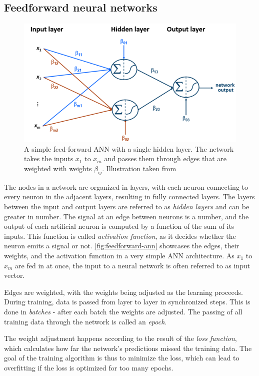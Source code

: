\subsection{Feedforward neural networks}
\label{sec:feedforward-networks}
\begin{figure}[ht!]
    \centering
    \includegraphics[width=.85\textwidth]{gfx/feedforward-neural-network.png}
    \caption[A simple feed-forward ANN with a single hidden layer]{A simple feed-forward ANN with a single hidden layer. The network takes the inputs $x_1$ to $x_m$ and passes them through edges that are weighted with weights $\beta_{ij}$. Illustration taken from \cite{lessmannBADS}}
    \label{fig:feedforward-ann}
\end{figure}

The nodes in a network are organized in layers, with each neuron connecting to every neuron in the adjacent layers, resulting in fully connected layers. The layers between the input and output layers are referred to as \textit{hidden layers} and  can be greater in number. The signal at an edge between neurons is a number, and the output of each artificial neuron is computed by a function of the sum of its inputs. This function is called \textit{activation function}, as it decides whether the neuron emits a signal or not. \autoref{fig:feedforward-ann} showcases the edges, their weights, and the activation function in a very simple ANN architecture. As $x_1$ to $x_m$ are fed in at once, the input to a neural network is often referred to as input vector.

Edges are weighted, with the weights being adjusted as the learning proceeds. During training, data is passed from layer to layer in synchronized steps. This is done in \textit{batches} - after each batch the weights are adjusted. The passing of all training data through the network is called an \textit{epoch}.

The weight adjustment happens according to the result of the \textit{loss function}, which calculates how far the network's predictions missed the training data. The goal of the training algorithm is thus to minimize the loss, which can lead to overfitting if the loss is optimized for too many epochs.


